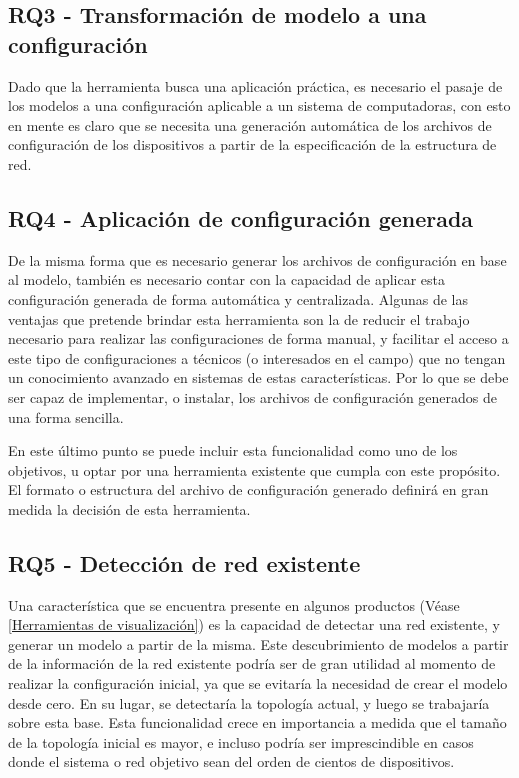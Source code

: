 \subsection{RQ3 - Transformación de modelo a una configuración} \label{RQ3}
Dado que la herramienta busca una aplicación práctica, es necesario el pasaje de los modelos a una configuración aplicable a un sistema de computadoras, con esto en mente es claro que se necesita una generación automática de los archivos de configuración de los dispositivos a partir de la especificación de la estructura de red.

\subsection{RQ4 - Aplicación de configuración generada} \label{RQ4}
De la misma forma que es necesario generar los archivos de configuración en base al modelo, también es necesario contar con la capacidad de aplicar esta configuración generada de forma automática y centralizada. Algunas de las ventajas que pretende brindar esta herramienta son la de reducir el trabajo necesario para realizar las configuraciones de forma manual, y facilitar el acceso a este tipo de configuraciones a técnicos (o interesados en el campo) que no tengan un conocimiento avanzado en sistemas de estas características. Por lo que se debe ser capaz de implementar, o instalar, los archivos de configuración generados de una forma sencilla. 

En este último punto se puede incluir esta funcionalidad como uno de los objetivos, u optar por una herramienta existente que cumpla con este propósito. El formato o estructura del archivo de configuración generado definirá en gran medida la decisión de esta herramienta.


\subsection{RQ5 - Detección de red existente} \label{RQ5}
Una característica que se encuentra presente en algunos productos (Véase \ref{Herramientas de visualización}) es la capacidad de detectar una red existente, y generar un modelo a partir de la misma. Este descubrimiento de modelos a partir de la información de la red existente podría ser de gran utilidad al momento de realizar la configuración inicial, ya que se evitaría la necesidad de crear el modelo desde cero. En su lugar, se detectaría la topología actual, y luego se trabajaría sobre esta base. Esta funcionalidad crece en importancia a medida que el tamaño de la topología inicial es mayor, e incluso podría ser imprescindible en casos donde el sistema o red objetivo sean del orden de cientos de dispositivos. 

